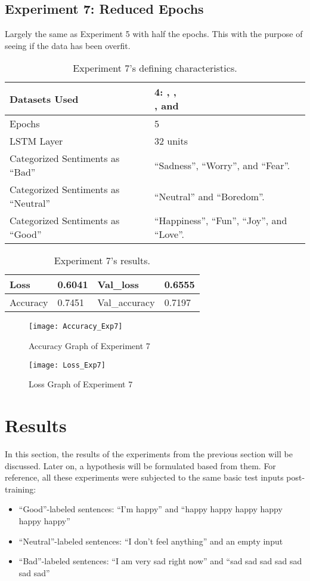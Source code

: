 \subsection{Experiment 7: Reduced Epochs}
\label{exp7}
Largely the same as Experiment 5 with half the epochs. This with the purpose of seeing if the data has been overfit.
\begin{table}[!h]
	\caption{Experiment 7's defining characteristics.}
	\vspace{0.5cm}
	\centering
	\begin{tabular}[t]{|l|l|}
	\hline
		Datasets Used & \makecell{4: \citet{d1}, \citet{d2},\\ \citet{d3}, and \citet{d4}}
	\\ \hline
		Epochs & 5
	\\ \hline
		LSTM Layer & 32 units
	\\ \hline
		Categorized Sentiments as ``Bad'' & ``Sadness'', ``Worry'', and ``Fear''.
	\\ \hline	
		 Categorized Sentiments as ``Neutral'' & ``Neutral'' and ``Boredom''.
	\\ \hline	
		Categorized Sentiments as ``Good'' & ``Happiness'', ``Fun'', ``Joy'', and ``Love''.
	\\ \hline
	\end{tabular}
\end{table}

\begin{table}[!b]
	\caption{Experiment 7's results.}
	\vspace{0.5cm}
	\centering
	\begin{tabular}[t]{|l|l|l|l|}
	\hline
		Loss & 0.6041 & Val\_loss & 0.6555
	\\ \hline
		Accuracy & 0.7451 & Val\_accuracy & 0.7197
	\\ \hline
	\end{tabular}
\end{table}


\begin{figure}[!h]
	\centering
	\texttt{[image: Accuracy\_Exp7]}
	\caption{Accuracy Graph of Experiment 7}
	\label{fig:accuracy_exp7}
	\texttt{[image: Loss\_Exp7]}
	\caption{Loss Graph of Experiment 7}
	\label{fig:loss_exp7}
\end{figure}
\pagebreak

\section{Results}
In this section, the results of the experiments from the previous section will be discussed. Later on, a hypothesis will be formulated based from them. For reference, all these experiments were subjected to the same basic test inputs post-training:
\begin{itemize}
	\item ``Good''-labeled sentences: ``I'm happy'' and ``happy happy happy happy happy happy''
	\item ``Neutral''-labeled sentences: ``I don't feel anything'' and an empty input
	\item ``Bad''-labeled sentences: ``I am very sad right now'' and ``sad sad sad sad sad sad sad''
\end{itemize}
